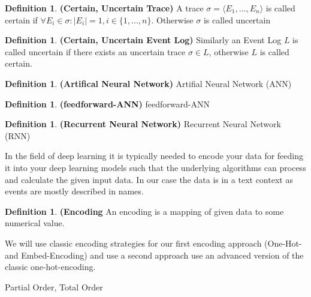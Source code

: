 \documentclass[
	a4paper,
	pagesize,
	pdftex,
	12pt,
	ngerman,
	fleqn,
	final,
	]{scrartcl}
\theoremstyle{plain}
\theoremstyle{definition}
\newtheorem{defn}[thm]{Definition}
\begin{document}
		\begin{defn}{\textbf{(Certain, Uncertain Trace)}}
			A trace \(\sigma = \langle E_1, ..., E_n \rangle\) is called certain if \(\forall E_i \in \sigma: |E_i| = 1, i \in \{1, ..., n\}\). Otherwise $\sigma$ is called uncertain
		\end{defn}
	
		\begin{defn}{\textbf{(Certain, Uncertain Event Log)}}
			Similarly an Event Log \(L\) is called uncertain if there exists an uncertain trace \(\sigma \in L\), otherwise \(L\) is called certain.
		\end{defn}


		\begin{defn}{\textbf{(Artifical Neural Network)}}
			Artifial Neural Network (ANN)
		\end{defn}
		\begin{defn}{\textbf{(feedforward-ANN)}}
			feedforward-ANN
		\end{defn}
		\begin{defn}{\textbf{(Recurrent Neural Network)}}
			Recurrent Neural Network (RNN)
		\end{defn}
	
		In the field of deep learning it is typically needed to encode your data for feeding it into your deep learning models such that the underlying algorithms can process and calculate the given input data. 
		In our case the data is in a text context as events are mostly described in names.
		
		\begin{defn}{\textbf{(Encoding}}
			An encoding is a mapping of given data to some numerical value. 
		\end{defn}
		
		We will use classic encoding strategies for our first encoding approach (One-Hot- and Embed-Encoding) and use a second approach use an advanced version of the classic one-hot-encoding. 
		
		Partial Order, Total Order \\ 
	
\end{document}
